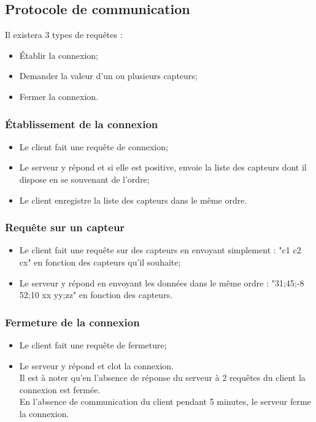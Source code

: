 \subsection{Protocole de communication}
Il existera 3 types de requêtes :
\begin{itemize}
\item Établir la connexion;
\item Demander la valeur d'un ou plusieurs capteurs;
\item Fermer la connexion.
\end{itemize}

\subsubsection{Établissement de la connexion}
\begin{itemize}
\item Le client fait une requête de connexion;\\
\item Le serveur y répond et si elle est positive, envoie la liste des capteurs dont il dispose en se souvenant de l'ordre;\\
\item Le client enregistre la liste des capteurs dans le même ordre.\\
\end{itemize}

\subsubsection{Requête sur un capteur}
\begin{itemize}
\item Le client fait une requête sur des capteurs en envoyant simplement : "c1 c2 cx" en fonction des capteurs qu'il souhaite; \\
\item Le serveur y répond en envoyant les données dans le même ordre : "31;45;-8 52;10 xx yy;zz" en fonction des capteurs.\\
\end{itemize}

\subsubsection{Fermeture de la connexion}
\begin{itemize}
\item Le client fait une requête de fermeture;\\
\item Le serveur y répond et clot la connexion.\\

Il est à noter qu'en l'absence de réponse du serveur à 2 requêtes du client la connexion est fermée. \\En l'absence de communication du client pendant 5 minutes, le serveur ferme la connexion.
\end{itemize}